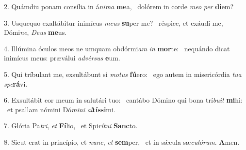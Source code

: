 2. Quámdiu ponam consília in á\textit{ni}\textit{ma} \textbf{me}a, \ast\  dolórem in corde \textit{me}\textit{o} \textit{per} \textbf{di}em?\

3. Usquequo exaltábitur inimícus \textit{me}\textit{us} \textbf{su}per me? \ast\  réspice, et exáudi me, Dómi\textit{ne}, \textit{De}\textit{us} \textbf{me}us.\

4. Illúmina óculos meos ne umquam obdórmi\textit{am} \textit{in} \textbf{mor}te: \ast\  nequándo dicat inimícus meus: præválui \textit{ad}\textit{vér}\textit{sus} \textbf{e}um.\

5. Qui tríbulant me, exsultábunt si \textit{mo}\textit{tus} \textbf{fú}ero: \ast\  ego autem in misericórdia \textit{tu}\textit{a} \textit{spe}\textbf{rá}vi.\

6. Exsultábit cor meum in salutári tuo: \dag\  cantábo Dómino qui bona trí\textit{bu}\textit{it} \textbf{mi}hi: \ast\  et psallam nómini Dó\textit{mi}\textit{ni} \textit{al}\textbf{tís}\textbf{si}mi.\

7. Glória Pa\textit{tri}, \textit{et} \textbf{Fí}lio, \ast\  et Spi\textit{rí}\textit{tu}\textit{i} \textbf{Sanc}to.\

8. Sicut erat in princípio, et \textit{nunc}, \textit{et} \textbf{sem}per, \ast\  et in sǽcula sæ\textit{cu}\textit{ló}\textit{rum}. \textbf{A}men.\

